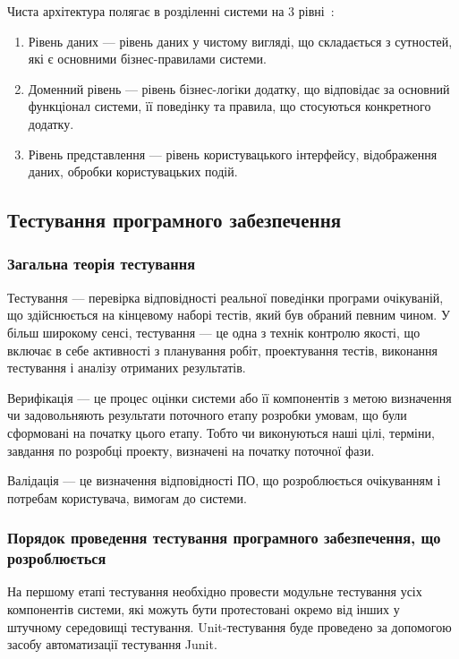 Чиста архітектура полягає в розділенні системи на 3 рівні~\cite{Arch2007}: 
\begin{enumerate}
	\item Рівень даних --- рівень даних у чистому вигляді, що складається з сутностей, які є основними бізнес-правилами системи.
	\item Доменний рівень --- рівень бізнес-логіки додатку, що відповідає за основний функціонал системи, її поведінку та правила, що стосуються конкретного додатку.
	\item Рівень представлення --- рівень користувацького інтерфейсу, відображення даних, обробки користувацьких подій.
\end{enumerate}

\subsection{Тестування програмного забезпечення}
\subsubsection{Загальна теорія тестування}
Тестування --- перевірка відповідності реальної поведінки програми очікуваній, що здійснюється на кінцевому наборі тестів, який був обраний певним чином. 
У більш широкому сенсі, тестування --- це одна з технік контролю якості, що включає в себе активності з планування робіт, проектування тестів, виконання тестування і аналізу отриманих результатів.

Верифікація --- це процес оцінки системи або її компонентів з метою визначення чи задовольняють результати поточного етапу розробки умовам, що були сформовані на початку цього етапу. 
Тобто чи виконуються наші цілі, терміни, завдання по розробці проекту, визначені на початку поточної фази.

Валідація --- це визначення відповідності ПО, що розроблюється очікуванням і потребам користувача, вимогам до системи. 

\subsubsection{Порядок проведення тестування програмного забезпечення, що розроблюється}
На першому етапі тестування необхідно провести модульне тестування усіх компонентів системи, які можуть бути протестовані окремо від інших у штучному середовищі тестування. 
Unit-тестування буде проведено за допомогою засобу автоматизації тестування Junit.

